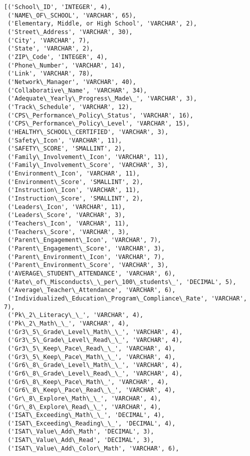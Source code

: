 \documentclass[11pt]{article}
\makeatletter
\newcommand{\boxspacing}{\kern\kvtcb@left@rule\kern\kvtcb@boxsep}
\newcommand{\prompt}[4]{
        \ttfamily\llap{{\color{#2}[#3]:\hspace{3pt}#4}}\vspace{-\baselineskip}
    }
\makeatother
\begin{document}
            \begin{tcolorbox}[breakable, size=fbox, boxrule=.5pt, pad at break*=1mm, opacityfill=0]
\prompt{Out}{outcolor}{14}{\boxspacing}
\begin{Verbatim}[commandchars=\\\{\}]
[('School\_ID', 'INTEGER', 4),
 ('NAME\_OF\_SCHOOL', 'VARCHAR', 65),
 ('Elementary, Middle, or High School', 'VARCHAR', 2),
 ('Street\_Address', 'VARCHAR', 30),
 ('City', 'VARCHAR', 7),
 ('State', 'VARCHAR', 2),
 ('ZIP\_Code', 'INTEGER', 4),
 ('Phone\_Number', 'VARCHAR', 14),
 ('Link', 'VARCHAR', 78),
 ('Network\_Manager', 'VARCHAR', 40),
 ('Collaborative\_Name', 'VARCHAR', 34),
 ('Adequate\_Yearly\_Progress\_Made\_', 'VARCHAR', 3),
 ('Track\_Schedule', 'VARCHAR', 12),
 ('CPS\_Performance\_Policy\_Status', 'VARCHAR', 16),
 ('CPS\_Performance\_Policy\_Level', 'VARCHAR', 15),
 ('HEALTHY\_SCHOOL\_CERTIFIED', 'VARCHAR', 3),
 ('Safety\_Icon', 'VARCHAR', 11),
 ('SAFETY\_SCORE', 'SMALLINT', 2),
 ('Family\_Involvement\_Icon', 'VARCHAR', 11),
 ('Family\_Involvement\_Score', 'VARCHAR', 3),
 ('Environment\_Icon', 'VARCHAR', 11),
 ('Environment\_Score', 'SMALLINT', 2),
 ('Instruction\_Icon', 'VARCHAR', 11),
 ('Instruction\_Score', 'SMALLINT', 2),
 ('Leaders\_Icon', 'VARCHAR', 11),
 ('Leaders\_Score', 'VARCHAR', 3),
 ('Teachers\_Icon', 'VARCHAR', 11),
 ('Teachers\_Score', 'VARCHAR', 3),
 ('Parent\_Engagement\_Icon', 'VARCHAR', 7),
 ('Parent\_Engagement\_Score', 'VARCHAR', 3),
 ('Parent\_Environment\_Icon', 'VARCHAR', 7),
 ('Parent\_Environment\_Score', 'VARCHAR', 3),
 ('AVERAGE\_STUDENT\_ATTENDANCE', 'VARCHAR', 6),
 ('Rate\_of\_Misconducts\_\_per\_100\_students\_', 'DECIMAL', 5),
 ('Average\_Teacher\_Attendance', 'VARCHAR', 6),
 ('Individualized\_Education\_Program\_Compliance\_Rate', 'VARCHAR', 7),
 ('Pk\_2\_Literacy\_\_', 'VARCHAR', 4),
 ('Pk\_2\_Math\_\_', 'VARCHAR', 4),
 ('Gr3\_5\_Grade\_Level\_Math\_\_', 'VARCHAR', 4),
 ('Gr3\_5\_Grade\_Level\_Read\_\_', 'VARCHAR', 4),
 ('Gr3\_5\_Keep\_Pace\_Read\_\_', 'VARCHAR', 4),
 ('Gr3\_5\_Keep\_Pace\_Math\_\_', 'VARCHAR', 4),
 ('Gr6\_8\_Grade\_Level\_Math\_\_', 'VARCHAR', 4),
 ('Gr6\_8\_Grade\_Level\_Read\_\_', 'VARCHAR', 4),
 ('Gr6\_8\_Keep\_Pace\_Math\_', 'VARCHAR', 4),
 ('Gr6\_8\_Keep\_Pace\_Read\_\_', 'VARCHAR', 4),
 ('Gr\_8\_Explore\_Math\_\_', 'VARCHAR', 4),
 ('Gr\_8\_Explore\_Read\_\_', 'VARCHAR', 4),
 ('ISAT\_Exceeding\_Math\_\_', 'DECIMAL', 4),
 ('ISAT\_Exceeding\_Reading\_\_', 'DECIMAL', 4),
 ('ISAT\_Value\_Add\_Math', 'DECIMAL', 3),
 ('ISAT\_Value\_Add\_Read', 'DECIMAL', 3),
 ('ISAT\_Value\_Add\_Color\_Math', 'VARCHAR', 6),

\end{Verbatim}
\end{tcolorbox}
\end{document}
